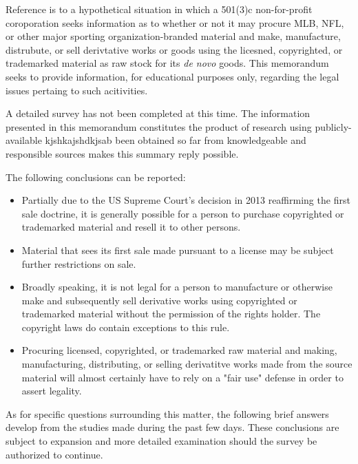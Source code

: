 \documentclass[letterpaper,11pt]{texMemo}
\begin{document}
\maketitle

Reference is to a hypothetical situation in which a 501(3)c non-for-profit coroporation seeks information as to whether or not it may procure MLB, NFL, or other major sporting organization-branded material and make, manufacture, distrubute, or sell derivtative works or goods using the licesned, copyrighted, or trademarked material as raw stock for its \emph{de novo} goods. This memorandum seeks to provide information, for educational purposes only, regarding the legal issues pertaing to such acitivities.

A detailed survey has not been completed at this time.  The information presented in this memorandum constitutes the product of research using publicly-available kjshkajshdkjsab been obtained so far from knowledgeable and responsible sources makes this summary reply possible.

The following conclusions can be reported:

\begin{itemize}
 \item Partially due to the US Supreme Court's decision in 2013 reaffirming the first sale doctrine, it is generally possible for a person to purchase copyrighted or trademarked material and resell it to other persons.
 \item Material that sees its first sale made pursuant to a license may be subject further restrictions on sale.
 \item Broadly speaking, it is not legal for a person to manufacture or otherwise make and subsequently sell derivative works using copyrighted or trademarked material without the permission of the rights holder. The copyright laws do contain exceptions to this rule.
 \item Procuring licensed, copyrighted, or trademarked raw material and making, manufacturing, distributing, or selling derivatitve works made from the source material will almost certainly have to rely on a "fair use" defense in order to assert legality.
\end{itemize}

As for specific questions surrounding this matter, the following brief answers develop from the studies made during the past few days. These conclusions are subject to expansion and more detailed examination should the survey be authorized to continue.
\end{document}
